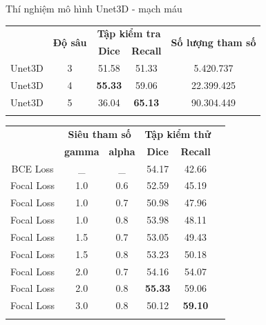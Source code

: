 \documentclass[
	10pt,                %
	aspectratio=169,     %
]{beamer}
\begin{document}
	\begin{frame}[noframenumbering]{Thí nghiệm mô hình Unet3D - mạch máu}
	    \begin{table}[H]
            \centering
            \begin{tabular}{c|c|c|c|c}
            \Xhline{3\arrayrulewidth}
            \multirow{2}{*}{\textbf{Mô hình}} & \multirow{2}{*}{\textbf{Độ sâu}} & \multicolumn{2}{c|}{\textbf{Tập kiểm tra}} & \multirow{2}{*}{\textbf{Số lượng tham số}} \\ 
            \cline{3-4} 
            &       &\textbf{Dice}       & \textbf{Recall}    &                 \\ \hline
            Unet3D  & 3 & 51.58               & 51.33              & 5.420.737       \\ \hline
            Unet3D  & 4 & \textbf{55.33}      & 59.06              & 22.399.425      \\ \hline
            Unet3D  & 5 & 36.04               & \textbf{65.13}     & 90.304.449      \\
            \Xhline{3\arrayrulewidth}
            \end{tabular}
            \end{table}
            \vspace{-0.2cm}
            \begin{table}[H]
            \centering
            \begin{tabular}{c c c c c c}
                \Xhline{3\arrayrulewidth}
                \multirow{2}{*}{\textbf{Hàm lỗi}} & \multicolumn{2}{c}{\textbf{Siêu tham số}} & \multicolumn{2}{c}{\textbf{Tập kiểm thử}} \\ \cline{2-5}
                 & \textbf{gamma} & \textbf{alpha} & \textbf{Dice} & \textbf{Recall} \\
                \hline
                BCE Loss   & \_  & \_  & 54.17 & 42.66 \\
                \hline
                Focal Loss & 1.0 & 0.6 & 52.59 & 45.19\\
                Focal Loss & 1.0 & 0.7 & 50.98 & 47.96\\
                Focal Loss & 1.0 & 0.8 & 53.98 & 48.11\\
                Focal Loss & 1.5 & 0.7 & 53.05 & 49.43\\
                Focal Loss & 1.5 & 0.8 & 53.23 & 50.18\\
                Focal Loss & 2.0 & 0.7 & 54.16 & 54.07\\
                Focal Loss & 2.0 & 0.8 & \textbf{55.33}  & 59.06\\
                Focal Loss & 3.0 & 0.8 & 50.12 & \textbf{59.10}\\
                \Xhline{3\arrayrulewidth}
                \end{tabular}
        \end{table}
	\end{frame}
	
\end{document}
